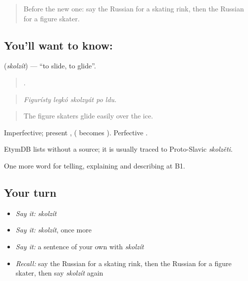 \begin{quote}
Before the new one: say the Russian for a skating rink, then the Russian for a figure skater.
\end{quote}

\subsection*{You'll want to know: }
\textbf{} (\emph{skolzít}) — \textquotedblleft{}to slide, to glide\textquotedblright{}.

\begin{quote}
    .
\end{quote}

\begin{quote}
\emph{Figurísty legkó skolzyát po ldu.}
\end{quote}

\begin{quote}
The figure skaters glide easily over the ice.
\end{quote}

Imperfective; present ,  ( becomes ). Perfective .

\begin{cousinweb}
EtymDB lists \emph{} without a source; it is usually traced to Proto-Slavic \emph{skolzěti}.
\end{cousinweb}

\begin{grammarlens}[title={What you've built}]
One more word for telling, explaining and describing at B1.
\end{grammarlens}

\subsection*{Your turn}
\begin{itemize}
\raggedright
  \item \emph{Say it:} \emph{skolzít}
  \item \emph{Say it:} \emph{skolzít}, once more
  \item \emph{Say it:} a sentence of your own with \emph{skolzít}
  \item \emph{Recall:} say the Russian for a skating rink, then the Russian for a figure skater, then say \emph{skolzít} again
\end{itemize}

